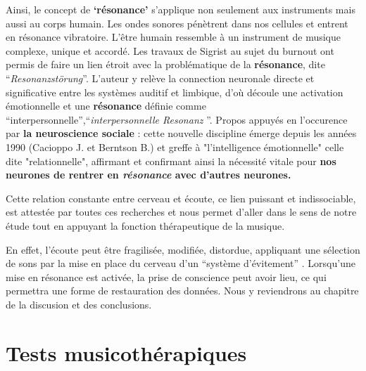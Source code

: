 Ainsi, le concept de \textbf{`résonance'} s'applique non seulement aux instruments mais aussi au corps humain. Les ondes sonores pénètrent dans nos cellules et entrent en résonance vibratoire. L'être humain ressemble à un instrument de musique complexe, unique et accordé.
Les travaux de Sigrist au sujet du burnout ont permis de faire un lien étroit avec la problématique de la
 \textbf{résonance}, dite \enquote{\textit{Resonanzstörung}}.
L'auteur y relève la connection neuronale
directe et significative entre les systèmes auditif et
         limbique, d'où découle une activation émotionnelle et une
         \textbf{résonance} définie comme
         ``interpersonnelle'',\enquote{\textit{interpersonnelle
             Resonanz} }\autocite[55--90] {sigrist_burnout_2016}.
Propos appuyés en l'occurence par \textbf{la neuroscience sociale} \autocite[201]{van_eersel_cerveau}:  cette nouvelle discipline émerge depuis
les années 1990 (Cacioppo J. et Berntson B.) et greffe à "l'intelligence
émotionnelle" celle dite "relationnelle", affirmant et confirmant ainsi la nécessité vitale pour
 \textbf{nos neurones  de rentrer en \textit{résonance} avec d'autres neurones.}


 Cette relation constante entre cerveau et écoute,
ce lien puissant et indissociable, est attestée par toutes ces recherches et nous permet d'aller dans
 le sens de notre étude tout en appuyant
 la fonction thérapeutique de la musique.


En effet, l'écoute peut être fragilisée, modifiée, distordue, appliquant une sélection de sons par la mise en place du cerveau d'un \enquote{système d'évitement} \autocite {Kabat-Zinn}.
Lorsqu'une mise en résonance est activée, la prise de conscience peut avoir lieu, ce qui permettra une forme de restauration des données.
Nous y reviendrons au chapitre de la discusion et des conclusions.










\chapter{Tests musicothérapiques}

